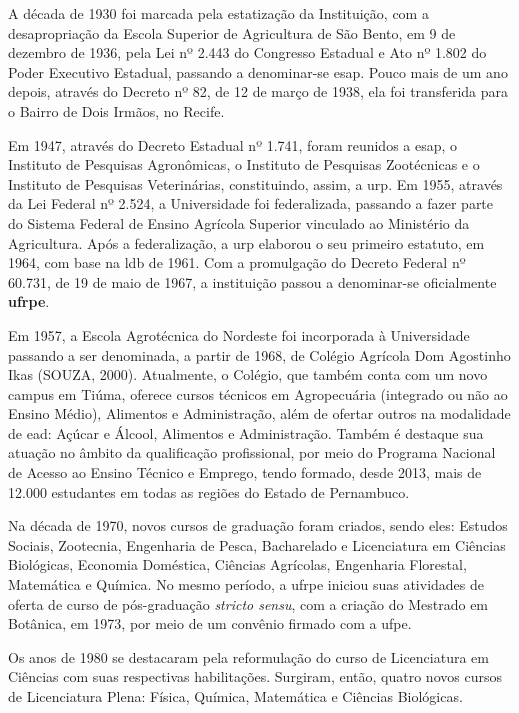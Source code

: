 \documentclass[
	12pt,				%
	openright,			%
  oneside,     %
	a4paper,			%
 hyphens,
	chapter=TITLE,		%
	english,			%
	french,				%
	spanish,			%
	brazil				%
	]{abntex2}
\begin{document}
A década de 1930 foi marcada pela estatização da Instituição, com a desapropriação da Escola Superior de Agricultura de São Bento, em 9 de dezembro de 1936, pela Lei nº 2.443 do Congresso Estadual e Ato nº 1.802 do Poder Executivo Estadual, passando a denominar-se \acrfull{esap}. Pouco mais de um ano depois, através do Decreto nº 82, de 12 de março de 1938, ela foi transferida para o Bairro de Dois Irmãos, no Recife.

Em 1947, através do Decreto Estadual nº 1.741, foram reunidos a \acrshort{esap}, o Instituto de Pesquisas Agronômicas, o Instituto de Pesquisas Zootécnicas e o Instituto de Pesquisas Veterinárias, constituindo, assim, a \acrfull{urp}. Em 1955, através da Lei Federal nº 2.524, a Universidade foi federalizada, passando a fazer parte do Sistema Federal de Ensino Agrícola Superior vinculado ao Ministério da Agricultura. Após a federalização, a \acrshort{urp} elaborou o seu primeiro estatuto, em 1964, com base na \acrshort{ldb} de 1961. Com a promulgação do Decreto Federal nº 60.731, de 19 de maio de 1967, a instituição passou a denominar-se oficialmente \textbf{\acrfull{ufrpe}}.

Em 1957, a Escola Agrotécnica do Nordeste foi incorporada à Universidade passando a ser denominada, a partir de 1968, de Colégio Agrícola Dom Agostinho Ikas (SOUZA, 2000). Atualmente, o Colégio, que também conta com um novo campus em Tiúma, oferece cursos técnicos em Agropecuária (integrado ou não ao Ensino Médio), Alimentos e Administração, além de ofertar outros na modalidade de \acrfull{ead}: Açúcar e Álcool, Alimentos e Administração. Também é destaque sua atuação no âmbito da qualificação profissional, por meio do Programa Nacional de Acesso ao Ensino Técnico e Emprego, tendo formado, desde 2013, mais de 12.000 estudantes em todas as regiões do Estado de Pernambuco.

Na década de 1970, novos cursos de graduação foram criados, sendo eles: Estudos Sociais, Zootecnia, Engenharia de Pesca, Bacharelado e Licenciatura em Ciências Biológicas, Economia Doméstica, Ciências Agrícolas, Engenharia Florestal, Matemática e Química. No mesmo período, a \acrshort{ufrpe} iniciou suas atividades de oferta de curso de pós-graduação \textit{stricto sensu}, com a criação do Mestrado em Botânica, em 1973, por meio de um convênio firmado com a \acrfull{ufpe}.

Os anos de 1980 se destacaram pela reformulação do curso de Licenciatura em Ciências com suas respectivas habilitações. Surgiram, então, quatro novos cursos de Licenciatura Plena: Física, Química, Matemática e Ciências Biológicas.
\end{document}
